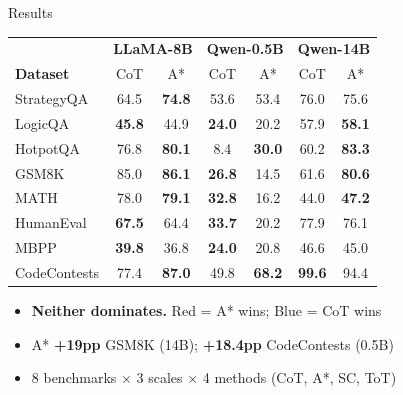 \documentclass[t]{beamer}
\begin{document}
\begin{frame}{Results}

\begin{table}
\centering
\scriptsize
\setlength{\tabcolsep}{3pt}
\begin{tabular}{l|cc|cc|cc}
\toprule
& \multicolumn{2}{c|}{\textbf{LLaMA-8B}} & \multicolumn{2}{c|}{\textbf{Qwen-0.5B}} & \multicolumn{2}{c}{\textbf{Qwen-14B}} \\
\textbf{Dataset} & CoT & A* & CoT & A* & CoT & A* \\
\midrule
StrategyQA & 64.5 & \cellcolor{red!12}\textbf{74.8} & 53.6 & 53.4 & 76.0 & 75.6 \\
LogicQA & \cellcolor{blue!10}\textbf{45.8} & 44.9 & \cellcolor{blue!10}\textbf{24.0} & 20.2 & 57.9 & \cellcolor{red!12}\textbf{58.1} \\
HotpotQA & 76.8 & \cellcolor{red!12}\textbf{80.1} & 8.4 & \cellcolor{red!12}\textbf{30.0} & 60.2 & \cellcolor{red!12}\textbf{83.3} \\
\midrule
GSM8K & 85.0 & \cellcolor{red!12}\textbf{86.1} & \cellcolor{blue!10}\textbf{26.8} & 14.5 & 61.6 & \cellcolor{red!12}\textbf{80.6} \\
MATH & 78.0 & \cellcolor{red!12}\textbf{79.1} & \cellcolor{blue!10}\textbf{32.8} & 16.2 & 44.0 & \cellcolor{red!12}\textbf{47.2} \\
\midrule
HumanEval & \cellcolor{blue!10}\textbf{67.5} & 64.4 & \cellcolor{blue!10}\textbf{33.7} & 20.2 & 77.9 & 76.1 \\
MBPP & \cellcolor{blue!10}\textbf{39.8} & 36.8 & \cellcolor{blue!10}\textbf{24.0} & 20.8 & 46.6 & 45.0 \\
CodeContests & 77.4 & \cellcolor{red!12}\textbf{87.0} & 49.8 & \cellcolor{red!12}\textbf{68.2} & \cellcolor{blue!10}\textbf{99.6} & 94.4 \\
\bottomrule
\end{tabular}
\end{table}

\begin{itemize}\small
    \item \textbf{Neither dominates.} \textcolor{red!70!black}{Red} = A* wins; \textcolor{blue!70!black}{Blue} = CoT wins
    \item A* \textbf{+19pp} GSM8K (14B); \textbf{+18.4pp} CodeContests (0.5B)
    \item 8 benchmarks $\times$ 3 scales $\times$ 4 methods (CoT, A*, SC, ToT)
\end{itemize}

\end{frame}
\end{document}
